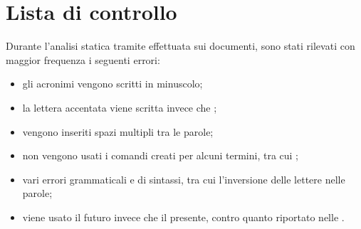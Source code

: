 \section{Lista di controllo}
Durante l'analisi statica tramite  effettuata sui documenti, sono stati rilevati con maggior frequenza i seguenti errori:
\begin{itemize}
	\item gli acronimi vengono scritti in minuscolo;
	\item la lettera  accentata viene scritta  invece che ;
	\item vengono inseriti spazi multipli tra le parole;
	\item non vengono usati i comandi creati per alcuni termini, tra cui \ProjectName{};
	\item vari errori grammaticali e di sintassi, tra cui l'inversione delle lettere nelle parole;
	\item viene usato il futuro invece che il presente, contro quanto riportato nelle \NormeDiProgetto{}.
\end{itemize}